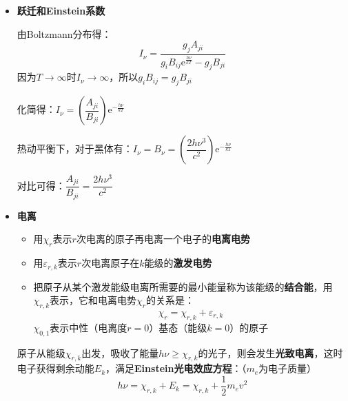 \documentclass{beamer}
\renewcommand\epsilon{\varepsilon}
\newenvironment{slide}{
    \begin{frame}{\bfseries{\sectiontitle}}
}{
    \end{frame}
}
\begin{document}
\begin{slide}
    \begin{itemize}
        \item \textbf{跃迁和Einstein系数}

        由Boltzmann分布得：
        \[
            I_\nu = \frac{g_jA_{ji}}{g_iB_{ij}\mathrm{e}^{\tfrac{h\nu}{kT}}-g_jB_{ji}}
        \]
        因为$T\to\infty$时$I_\nu\to\infty$，所以$\boxed{g_iB_{ij}=g_jB_{ji}}$

        化简得：$I_\nu = \left(\dfrac{A_{ji}}{B_{ji}}\right)\mathrm{e}^{-\tfrac{h\nu}{kT}}$

        热动平衡下，对于黑体有：$I_\nu = B_\nu = \left(\dfrac{2h\nu^3}{c^2}\right)\mathrm{e}^{-\tfrac{h\nu}{kT}}$

        对比可得：$\boxed{\dfrac{A_{ji}}{B_{ji}} = \dfrac{2h\nu^3}{c^2}}$
    \end{itemize}
\end{slide}

\begin{slide}
    \begin{itemize}
        \item \textbf{电离}
        \begin{itemize}
            \item 用$\chi_r$表示$r$次电离的原子再电离一个电子的\textbf{电离电势}

            \item 用$\epsilon_{r,k}$表示$r$次电离原子在$k$能级的\textbf{激发电势}

            \item 把原子从某个激发能级电离所需要的最小能量称为该能级的\textbf{结合能}，用$\chi_{r,k}$表示，它和电离电势$\chi_r$的关系是：
            \[
                \chi_r = \chi_{r,k} + \epsilon_{r,k}
            \]
            $\chi_{0,1}$表示中性（电离度$r=0$）基态（能级$k=0$）的原子
        \end{itemize}

        原子从能级$\chi_{r,k}$出发，吸收了能量$h\nu\geqslant\chi_{r,k}$的光子，则会发生\textbf{光致电离}，这时电子获得剩余动能$E_k$，满足\textbf{Einstein光电效应方程}：（$m_e$为电子质量）
        \[
            \boxed{
            h\nu = \chi_{r,k} + E_k = \chi_{r,k} + \frac{1}{2}m_ev^2
            }
        \]
    \end{itemize}
\end{slide}
\end{document}
